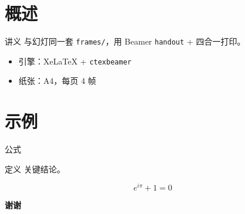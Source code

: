 \section{概述}

\begin{frame}{讲义}
  与幻灯同一套 \texttt{frames/}，用 Beamer \texttt{handout} + 四合一打印。
  \begin{itemize}
    \item 引擎：XeLaTeX + \texttt{ctexbeamer}
    \item 纸张：A4，每页 4 帧
  \end{itemize}
\end{frame}

\section{示例}

\begin{frame}{公式}
  \begin{block}{定义}
    关键结论。
  \end{block}
  \[ e^{i\pi}+1=0 \]
\end{frame}

\begin{frame}[plain]
  \vfill\centering
  {\Large\bfseries\color{chaptercolor} 谢谢\par}
  \vfill
\end{frame}
